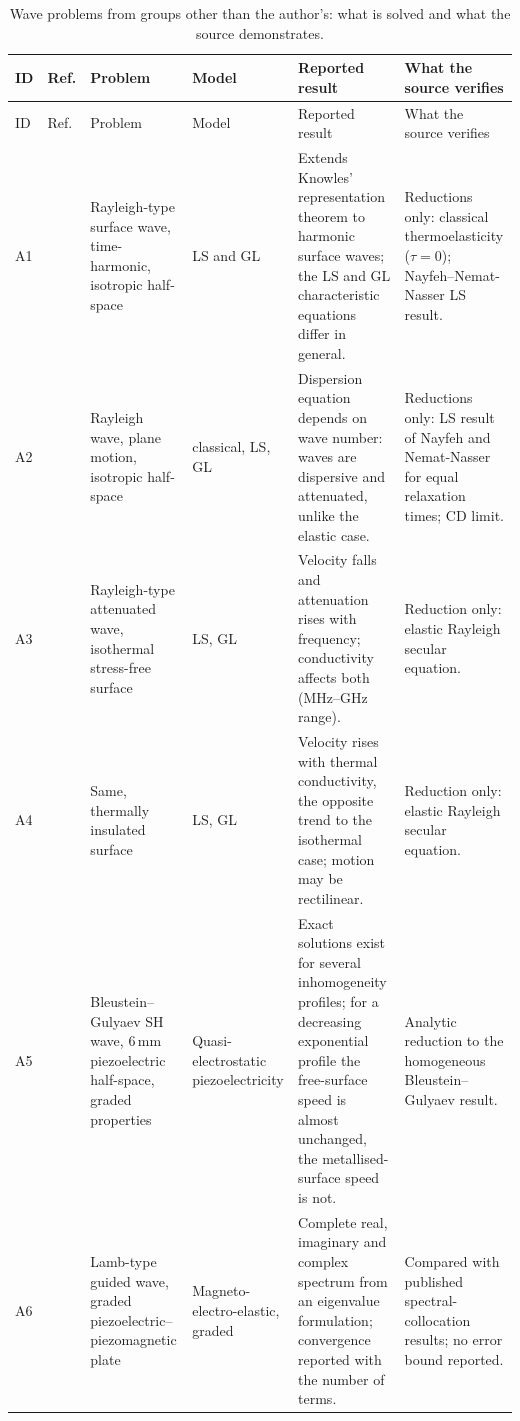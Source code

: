 {\footnotesize
\begin{longtable}{>{\raggedright\arraybackslash}p{0.8cm}>{\raggedright\arraybackslash}p{1.7cm}>{\raggedright\arraybackslash}p{2.6cm}>{\raggedright\arraybackslash}p{2.1cm}>{\raggedright\arraybackslash}p{3.4cm}>{\raggedright\arraybackslash}p{2.7cm}}
\caption{Wave problems from groups other than the author's: what is solved and what the source demonstrates.}\label{tab:atlas}\\
\toprule
ID & Ref. & Problem & Model & Reported result & What the source verifies \\
\midrule
\endfirsthead
\toprule
ID & Ref. & Problem & Model & Reported result & What the source verifies \\
\midrule
\endhead
\bottomrule
\endfoot
A1 & \citet{Agarwal1978} & Rayleigh-type surface wave, time-harmonic, isotropic half-space & LS and GL & Extends Knowles' representation theorem to harmonic surface waves; the LS and GL characteristic equations differ in general. & Reductions only: classical thermoelasticity ($\tau=0$); Nayfeh--Nemat-Nasser LS result. \\
A2 & \citet{AbdAlla2001} & Rayleigh wave, plane motion, isotropic half-space & classical, LS, GL & Dispersion equation depends on wave number: waves are dispersive and attenuated, unlike the elastic case. & Reductions only: LS result of Nayfeh and Nemat-Nasser for equal relaxation times; CD limit. \\
A3 & \citet{Sharma2014} & Rayleigh-type attenuated wave, isothermal stress-free surface & LS, GL & Velocity falls and attenuation rises with frequency; conductivity affects both (MHz--GHz range). & Reduction only: elastic Rayleigh secular equation. \\
A4 & \citet{Sharma2014} & Same, thermally insulated surface & LS, GL & Velocity rises with thermal conductivity, the opposite trend to the isothermal case; motion may be rectilinear. & Reduction only: elastic Rayleigh secular equation. \\
A5 & \citet{Collet2006} & Bleustein--Gulyaev SH wave, 6\,mm piezoelectric half-space, graded properties & Quasi-electrostatic piezoelectricity & Exact solutions exist for several inhomogeneity profiles; for a decreasing exponential profile the free-surface speed is almost unchanged, the metallised-surface speed is not. & Analytic reduction to the homogeneous Bleustein--Gulyaev result. \\
A6 & \citet{Zhang2018a} & Lamb-type guided wave, graded piezoelectric--piezomagnetic plate & Magneto-electro-elastic, graded & Complete real, imaginary and complex spectrum from an eigenvalue formulation; convergence reported with the number of terms. & Compared with published spectral-collocation results; no error bound reported. \\

\end{longtable}}
